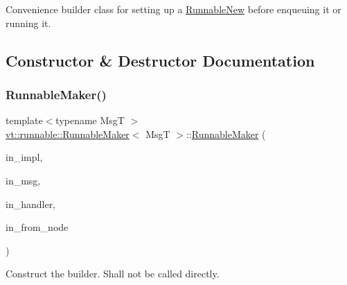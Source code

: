 Convenience builder class for setting up a {\ttfamily \hyperlink{structvt_1_1runnable_1_1_runnable_new}{Runnable\+New}} before enqueuing it or running it. 

\subsection{Constructor \& Destructor Documentation}
\mbox{\label{structvt_1_1runnable_1_1_runnable_maker_ad9d17a87f08a4da7758956c304586e34}} 
\subsubsection{\texorpdfstring{Runnable\+Maker()}{RunnableMaker()}\hspace{0.1cm}{\footnotesize\ttfamily [1/3]}}
{\footnotesize\ttfamily template$<$typename MsgT $>$ \\
\hyperlink{structvt_1_1runnable_1_1_runnable_maker}{vt\+::runnable\+::\+Runnable\+Maker}$<$ MsgT $>$\+::\hyperlink{structvt_1_1runnable_1_1_runnable_maker}{Runnable\+Maker} (\begin{DoxyParamCaption}\item[{std\+::unique\+\_\+ptr$<$ \hyperlink{structvt_1_1runnable_1_1_runnable_new}{Runnable\+New} $>$}]{in\+\_\+impl,  }\item[{\hyperlink{namespacevt_ab2b3d506ec8e8d1540aede826d84a239}{Msg\+Shared\+Ptr}$<$ MsgT $>$ const \&}]{in\+\_\+msg,  }\item[{\hyperlink{namespacevt_af64846b57dfcaf104da3ef6967917573}{Handler\+Type}}]{in\+\_\+handler,  }\item[{\hyperlink{namespacevt_a866da9d0efc19c0a1ce79e9e492f47e2}{Node\+Type}}]{in\+\_\+from\+\_\+node }\end{DoxyParamCaption})\hspace{0.3cm}{\ttfamily [inline]}}



Construct the builder. Shall not be called directly. 


